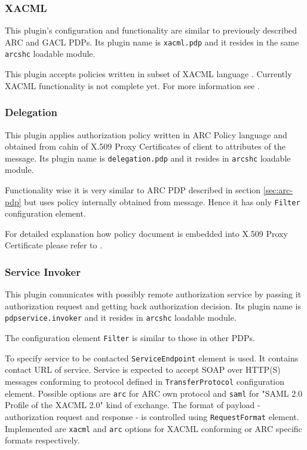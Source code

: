 \documentclass{article}
\begin{document}
\subsubsection{XACML}\label{xacml-pdp}
This plugin's configuration and functionality are similar to previously described ARC and
GACL PDPs.  Its plugin name is \texttt{xacml.pdp} and it resides in the same \texttt{arcshc}
loadable module.

This plugin accepts policies written in subset of XACML language \cite{xacml}. Currently 
XACML functionality is not complete yet. For more information see \cite{arc1-sec}.

\subsubsection{Delegation}\label{sec:delegation-pdp}
This plugin applies authorization policy written in ARC Policy language and obtained
from cahin of X.509 Proxy Certificates of client to attributes of the message. Its 
plugin name is \texttt{delegation.pdp} and it resides in \texttt{arcshc} loadable module.

Functionality wise it is very similar to ARC PDP described in section \ref{sec:arc-pdp}
but uses policy internally obtained from message. Hence it has only \texttt{Filter}
configuration element.

For detailed explanation how policy document is embedded into X.509 Proxy Certificate 
please refer to \cite{arc1-sec}.

\subsubsection{Service Invoker}\label{service-pdp}
This plugin comunicates with possibly remote authorization service by passing it authorization
request and getting back authorization decision. Its plugin name is \texttt{pdpservice.invoker}
and it resides in \texttt{arcshc} loadable module.

The configuration element \texttt{Filter} is similar to those in other PDPs.

To specify service to be contacted \texttt{ServiceEndpoint} element is used. It contains
contact URL of service. Service is expected to accept SOAP over HTTP(S) messages conforming
to protocol defined in \texttt{TransferProtocol} configuration element. Possible options
are \texttt{arc} for ARC own protocol and \texttt{saml} for "SAML 2.0 Profile of the XACML 2.0"
kind of exchange. The format of payload - authorization request and response - is controlled
using \texttt{RequestFormat} element. Implemented are \texttt{xacml} and \texttt{arc} options
for XACML conforming or ARC specific formats respectively.
\end{document}
